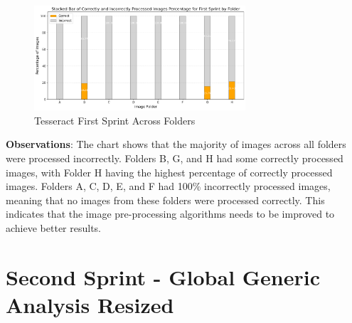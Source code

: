 \vspace{1in}



\begin{figure}[ht]
    \centering
    \includegraphics[width=0.7\textwidth]{Figures/Results/tesseract_sprints_one.png}
    \caption[Tesseract First Sprint Across Folders]{Tesseract First Sprint Across Folders}
    \label{fig:Tesseract First Sprint Across Folders}
\end{figure}

\vspace{1in}

\textbf{Observations}:
The chart shows that the majority of images across all folders were processed incorrectly. Folders B, G, and H had some correctly processed images, with Folder H having the highest percentage of correctly processed images. Folders A, C, D, E, and F had 100\% incorrectly processed images, meaning that no images from these folders were processed correctly. This indicates that the image pre-processing algorithms needs to be improved to achieve better results.

\newpage

\section{Second Sprint - Global Generic Analysis Resized}


